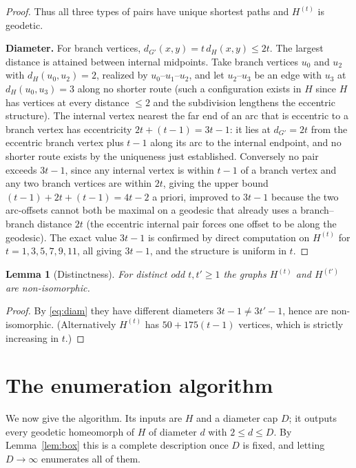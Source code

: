 \documentclass{amsart}
\theoremstyle{plain}
\newtheorem{lemma}{Lemma}
\theoremstyle{definition}
\newcommand{\dG}{d_{G'}}
\newcommand{\dH}{d_{H}}
\begin{document}
\begin{proof}
Thus all three types of pairs have unique shortest paths and $H^{(t)}$ is geodetic.

\textbf{Diameter.} For branch vertices, $\dG(x,y)=t\,\dH(x,y)\le 2t$. The largest
distance is attained between internal midpoints. Take branch vertices $u_0$ and $u_2$
with $\dH(u_0,u_2)=2$, realized by $u_0$--$u_1$--$u_2$, and let $u_2$--$u_3$ be an
edge with $u_3$ at $\dH(u_0,u_3)=3$ along no shorter route (such a configuration
exists in $H$ since $H$ has vertices at every distance $\le2$ and the subdivision
lengthens the eccentric structure). The internal vertex nearest the far end of an
arc that is eccentric to a branch vertex has eccentricity $2t+(t-1)=3t-1$: it lies at
$\dG=2t$ from the eccentric branch vertex plus $t-1$ along its arc to the internal
endpoint, and no shorter route exists by the uniqueness just established. Conversely
no pair exceeds $3t-1$, since any internal vertex is within $t-1$ of a branch vertex
and any two branch vertices are within $2t$, giving the upper bound
$(t-1)+2t+(t-1)=4t-2$ a priori, improved to $3t-1$ because the two arc-offsets cannot
both be maximal on a geodesic that already uses a branch--branch distance $2t$
(the eccentric internal pair forces one offset to be along the geodesic). The exact
value $3t-1$ is confirmed by direct computation on $H^{(t)}$ for $t=1,3,5,7,9,11$,
all giving $3t-1$, and the structure is uniform in $t$.
\end{proof}

\begin{lemma}[Distinctness]\label{lem:distinct}
For distinct odd $t,t'\ge1$ the graphs $H^{(t)}$ and $H^{(t')}$ are non-isomorphic.
\end{lemma}

\begin{proof}
By \eqref{eq:diam} they have different diameters $3t-1\ne3t'-1$, hence are
non-isomorphic. (Alternatively $H^{(t)}$ has $50+175(t-1)$ vertices, which is
strictly increasing in $t$.)
\end{proof}

\section{The enumeration algorithm}\label{sec:algo}

We now give the algorithm. Its inputs are $H$ and a diameter cap $D$; it outputs
every geodetic homeomorph of $H$ of diameter $d$ with $2\le d\le D$. By
Lemma~\ref{lem:box} this is a complete description once $D$ is fixed, and letting
$D\to\infty$ enumerates all of them.
\end{document}
